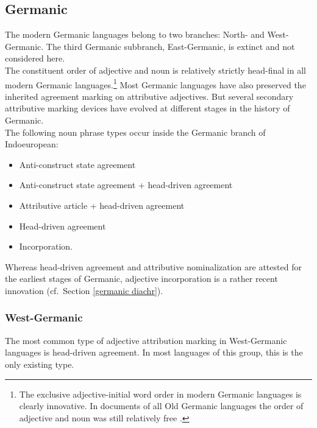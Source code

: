 \subsection{Germanic}
The modern Germanic languages belong to two branches: North- and West-Germanic. The third Germanic subbranch, East-Germanic, is extinct and not considered here.\\

\noindent The constituent order of adjective and noun is relatively strictly head-final in all modern Germanic languages.\footnote{The exclusive adjective-initial word order in modern Germanic languages is clearly innovative. In documents of all Old Germanic languages the order of adjective and noun was still relatively free \citep[cf.][]{heinrichs1954}.}  Most Germanic languages have also preserved the inherited agreement marking on attributive adjectives. But several secondary attributive marking devices have evolved at different stages in the history of Germanic.\\

\noindent The following noun phrase types occur inside the Germanic branch of Indoeuropean:
\begin{itemize}
\item{Anti-construct state agreement}
\item{Anti-construct state agreement + head-driven agreement}
\item{Attributive article + head-driven agreement}
\item{Head-driven agreement}
\item{Incorporation.}
\end{itemize}
Whereas head-driven agreement and attributive nominalization are attested for the earliest stages of Germanic, adjective incorporation is a rather recent innovation (cf.~Section \ref{germanic diachr}).

\subsubsection{West-Germanic}\label{w-germanic synchr}
The most common type of adjective attribution marking in West-Germanic languages is head-driven agreement. In most languages of this group, this is the only existing type.

